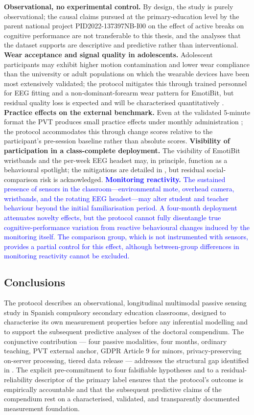 \textbf{Observational, no experimental control.} By design, the study is purely observational; the causal claims pursued at the primary-education level by the parent national project PID2022-137397NB-I00 on the effect of active breaks on cognitive performance are not transferable to this thesis, and the analyses that the dataset supports are descriptive and predictive rather than interventional. \textbf{Wear acceptance and signal quality in adolescents.} Adolescent participants may exhibit higher motion contamination and lower wear compliance than the university or adult populations on which the wearable devices have been most extensively validated; the protocol mitigates this through trained personnel for EEG fitting and a non-dominant-forearm wear pattern for EmotiBit, but residual quality loss is expected and will be characterised quantitatively \parencite{LauZhu2019_mobile_eeg_review}. \textbf{Practice effects on the external benchmark.} Even at the validated 5-minute format the PVT produces small practice effects under monthly administration \parencite{Basner2018_pvt_practice}; the protocol accommodates this through change scores relative to the participant's pre-session baseline rather than absolute scores. \textbf{Visibility of participation in a class-complete deployment.} The visibility of EmotiBit wristbands and the per-week EEG headset may, in principle, function as a behavioural spotlight; the mitigations are detailed in , but residual social-comparison risk is acknowledged. \textcolor{blue}{\textbf{Monitoring reactivity.} The sustained presence of sensors in the classroom---environmental mote, overhead camera, wristbands, and the rotating EEG headset---may alter student and teacher behaviour beyond the initial familiarisation period. A four-month deployment attenuates novelty effects, but the protocol cannot fully disentangle true cognitive-performance variation from reactive behavioural changes induced by the monitoring itself. The comparison group, which is not instrumented with sensors, provides a partial control for this effect, although between-group differences in monitoring reactivity cannot be excluded.}

\subsection{Conclusions}\label{subsec:conclusions}

The protocol describes an observational, longitudinal multimodal passive sensing study in Spanish compulsory secondary education classrooms, designed to characterise its own measurement properties before any inferential modelling and to support the subsequent predictive analyses of the doctoral compendium. The conjunctive contribution --- four passive modalities, four months, ordinary teaching, PVT external anchor, GDPR Article 9 for minors, privacy-preserving on-server processing, tiered data release --- addresses the structural gap identified in . The explicit pre-commitment to four falsifiable hypotheses and to a residual-reliability descriptor of the primary label ensures that the protocol's outcome is empirically accountable and that the subsequent predictive claims of the compendium rest on a characterised, validated, and transparently documented measurement foundation.
